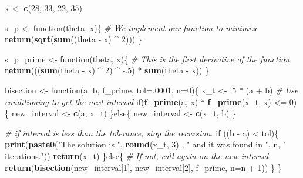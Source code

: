 \documentclass[]{article}
\newenvironment{Shaded}{\begin{snugshade}}{\end{snugshade}}
\newcommand{\KeywordTok}[1]{\textcolor[rgb]{0.13,0.29,0.53}{\textbf{{#1}}}}
\newcommand{\DataTypeTok}[1]{\textcolor[rgb]{0.13,0.29,0.53}{{#1}}}
\newcommand{\DecValTok}[1]{\textcolor[rgb]{0.00,0.00,0.81}{{#1}}}
\newcommand{\StringTok}[1]{\textcolor[rgb]{0.31,0.60,0.02}{{#1}}}
\newcommand{\CommentTok}[1]{\textcolor[rgb]{0.56,0.35,0.01}{\textit{{#1}}}}
\newcommand{\NormalTok}[1]{{#1}}
\begin{document}
\begin{Shaded}
\begin{Highlighting}[]
\NormalTok{x <-}\StringTok{ }\KeywordTok{c}\NormalTok{(}\DecValTok{28}\NormalTok{, }\DecValTok{33}\NormalTok{, }\DecValTok{22}\NormalTok{, }\DecValTok{35}\NormalTok{)}

\NormalTok{s_p <-}\StringTok{ }\NormalTok{function(theta, x)\{}
  \CommentTok{# We implement our function to minimize}
  \KeywordTok{return}\NormalTok{(}\KeywordTok{sqrt}\NormalTok{(}\KeywordTok{sum}\NormalTok{((theta -}\StringTok{ }\NormalTok{x) ^}\StringTok{ }\DecValTok{2}\NormalTok{)))}
\NormalTok{\}}

\NormalTok{s_p_prime <-}\StringTok{ }\NormalTok{function(theta, x)\{}
  \CommentTok{# This is the first derivative of the function}
  \KeywordTok{return}\NormalTok{(((}\KeywordTok{sum}\NormalTok{(theta -}\StringTok{ }\NormalTok{x) ^}\StringTok{ }\DecValTok{2}\NormalTok{) ^}\StringTok{ }\NormalTok{-.}\DecValTok{5}\NormalTok{) *}\StringTok{ }\KeywordTok{sum}\NormalTok{(theta -}\StringTok{ }\NormalTok{x))}
\NormalTok{\}}

\NormalTok{bisection <-}\StringTok{ }\NormalTok{function(a, b, f_prime, }\DataTypeTok{tol=}\NormalTok{.}\DecValTok{0001}\NormalTok{, }\DataTypeTok{n=}\DecValTok{0}\NormalTok{)\{}
  \NormalTok{x_t <-}\StringTok{ }\NormalTok{.}\DecValTok{5} \NormalTok{*}\StringTok{ }\NormalTok{(a +}\StringTok{ }\NormalTok{b)}
  \CommentTok{# Use conditioning to get the next interval}
  \NormalTok{if(}\KeywordTok{f_prime}\NormalTok{(a, x) *}\StringTok{ }\KeywordTok{f_prime}\NormalTok{(x_t, x) <=}\StringTok{ }\DecValTok{0}\NormalTok{)\{}
    \NormalTok{new_interval <-}\StringTok{ }\KeywordTok{c}\NormalTok{(a, x_t)}
  \NormalTok{\}else\{}
    \NormalTok{new_interval <-}\StringTok{ }\KeywordTok{c}\NormalTok{(x_t, b)}
  \NormalTok{\}}
  
  \CommentTok{# if interval is less than the tolerance, stop the recursion.}
  \NormalTok{if ((b -}\StringTok{ }\NormalTok{a) <}\StringTok{ }\NormalTok{tol)\{}
    \KeywordTok{print}\NormalTok{(}\KeywordTok{paste0}\NormalTok{(}\StringTok{"The solution is "}\NormalTok{, }\KeywordTok{round}\NormalTok{(x_t, }\DecValTok{3}\NormalTok{) , }\StringTok{" and it was found in "}\NormalTok{, n, }\StringTok{" iterations."}\NormalTok{))}
    \KeywordTok{return}\NormalTok{(x_t)}
  \NormalTok{\}else\{}
    \CommentTok{# If not, call again on the new interval}
    \KeywordTok{return}\NormalTok{(}\KeywordTok{bisection}\NormalTok{(new_interval[}\DecValTok{1}\NormalTok{], new_interval[}\DecValTok{2}\NormalTok{], f_prime, }\DataTypeTok{n=}\NormalTok{n +}\StringTok{ }\DecValTok{1}\NormalTok{))  }
  \NormalTok{\}}
\NormalTok{\}}


\end{Highlighting}
\end{Shaded}
\end{document}
